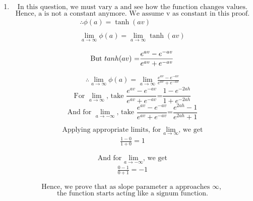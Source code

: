 \documentclass[12pt]{article}
\begin{document}
\begin{enumerate}
  \item \[
            \text{In this question, we must vary a and see how the function changes values.}
        \]
        \[
            \text{Hence, a is not a constant anymore. We assume v as constant in this proof.}
        \]
        \begin{gather}
            \therefore\phi(a) = \tanh(av) \nonumber \\ \nonumber\\ 
            \lim_{a\to\infty} \phi(a) = \lim_{a\to\infty}\tanh(av) \label{eqn:2}
        \end{gather}
        
        \[
            \text{But\ $tanh(av)$ =$\frac{e^{av}-e^{-av}}{e^{av}+e^{-av}}$} \\
        \]
        
        \begin{gather}             
            \therefore \lim_{a\to\infty} \phi(a) = \lim_{a\to\infty}\frac{e^{av}-e^{-av}}{e^{av}+e^{-av}} \label{eqn:3}    
        \end{gather}
        \[
            \text{For $\lim_{a\to\infty}$, take $\frac{e^{av}-e^{-av}}{e^{av}+e^{-av}}$=$\frac{1-e^{-2ah}}{1+e^{-2ah}}$}
        \]
        \[
            \text{And for $\lim_{a\to-\infty}$, take $\frac{e^{av}-e^{-av}}{e^{av}+e^{-av}}$=$\frac{e^{2ah}-1}{e^{2ah}+1}$}
        \]
        
        \[
            \text{Applying appropriate limits, for $\lim_{a\to\infty}$, we get} 
        \]
        \begin{gather}
            \frac{1-0}{1+0} = 1
        \end{gather}
        
        \[
            \text{And for $\lim_{a\to-\infty}$, we get} 
        \]
        \begin{gather}
            \frac{0-1}{0+1} = -1
        \end{gather}
       
        \[
            \text{Hence, we prove that as slope parameter a approaches $\infty$, } 
        \]
        \[
            \text{the function starts acting like a signum function.}
        \]
\end{enumerate}
\end{document}
